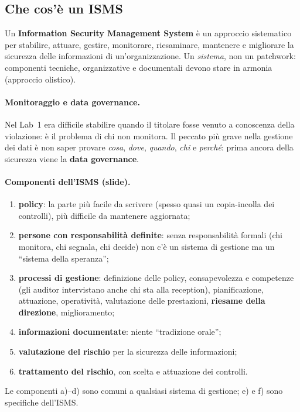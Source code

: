 \subsection{Che cos'è un ISMS}
Un \textbf{Information Security Management System} è un approccio sistematico per stabilire,
attuare, gestire, monitorare, riesaminare, mantenere e migliorare la sicurezza delle informazioni
di un'organizzazione. Un \emph{sistema}, non un patchwork: componenti tecniche, organizzative e
documentali devono stare in armonia (approccio olistico).

\paragraph{Monitoraggio e data governance.} Nel Lab~1 era difficile stabilire quando il titolare
fosse venuto a conoscenza della violazione: è il problema di chi non monitora. Il peccato più grave
nella gestione dei dati è non saper provare \emph{cosa}, \emph{dove}, \emph{quando}, \emph{chi} e
\emph{perché}: prima ancora della sicurezza viene la \textbf{data governance}.

\paragraph{Componenti dell'ISMS (slide).}
\begin{enumerate}[label=\alph*)]
  \item \textbf{policy}: la parte più facile da scrivere (spesso quasi un copia-incolla dei
    controlli), più difficile da mantenere aggiornata;
  \item \textbf{persone con responsabilità definite}: senza responsabilità formali (chi monitora, chi
    segnala, chi decide) non c'è un sistema di gestione ma un ``sistema della speranza'';
  \item \textbf{processi di gestione}: definizione delle policy, consapevolezza e competenze
    (gli auditor intervistano anche chi sta alla reception), pianificazione, attuazione, operatività,
    valutazione delle prestazioni, \textbf{riesame della direzione}, miglioramento;
  \item \textbf{informazioni documentate}: niente ``tradizione orale'';
  \item \textbf{valutazione del rischio} per la sicurezza delle informazioni;
  \item \textbf{trattamento del rischio}, con scelta e attuazione dei controlli.
\end{enumerate}
Le componenti a)--d) sono comuni a qualsiasi sistema di gestione; e) e f) sono specifiche
dell'ISMS.

